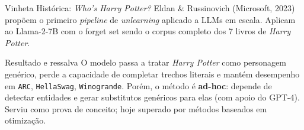 \documentclass[aspectratio=169,xcolor=dvipsnames]{beamer}
\begin{document}
  \begin{frame}{Vinheta Histórica: \textit{Who's Harry Potter?}}
    Eldan \& Russinovich (Microsoft, 2023) propõem o primeiro \textit{pipeline} de \textit{unlearning} aplicado a LLMs em escala. Aplicam ao Llama-2-7B com o forget set sendo o corpus completo dos 7 livros de \textit{Harry Potter}.

    \vspace{0.5em}
    \centering

    \vspace{0.4em}
    \begin{alertblock}{Resultado e ressalva}
      \footnotesize O modelo passa a tratar \textit{Harry Potter} como personagem genérico, perde a capacidade de completar trechos literais e mantém desempenho em \texttt{ARC}, \texttt{HellaSwag}, \texttt{Winogrande}. Porém, o método é \textbf{ad-hoc}: depende de detectar entidades e gerar substitutos genéricos para elas (com apoio do GPT-4). Serviu como prova de conceito; hoje superado por métodos baseados em otimização.
    \end{alertblock}
  \end{frame}
\end{document}
